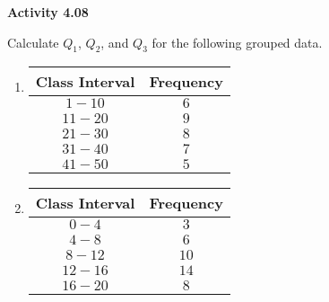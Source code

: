 \vspace{0.3ex}
\noindent\textbf{Activity 4.08}

\vspace{0.2ex}

Calculate \(Q_1\), \(Q_2\), and \(Q_3\) for the following grouped data.  
\begin{multicols}{2}
\begin{enumerate}
    \item 
    \begin{tabular}{|c|c|}
        \hline
        Class Interval & Frequency \\ \hline
        \(1 - 10\) & \(6\) \\ \hline
        \(11 - 20\) & \(9\) \\ \hline
        \(21 - 30\) & \(8\) \\ \hline
        \(31 - 40\) & \(7\) \\ \hline
        \(41 - 50\) & \(5\) \\ \hline
    \end{tabular}
    \item 
    \begin{tabular}{|c|c|}
        \hline
        Class Interval & Frequency \\ \hline
        \(0 - 4\) & \(3\) \\ \hline
        \(4 - 8\) & \(6\) \\ \hline
        \(8 - 12\) & \(10\) \\ \hline
        \(12 - 16\) & \(14\) \\ \hline
        \(16 - 20\) & \(8\) \\ \hline
    \end{tabular}
    \end{enumerate}
 \end{multicols}
